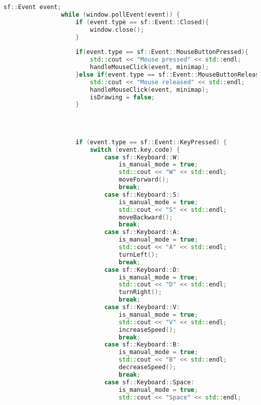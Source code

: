 \begin{lstlisting}[language={C++}, caption={Quinto ajuste de c\'odigo}, label={QuintoAjuste}]
                sf::Event event;
                while (window.pollEvent(event)) {
                    if (event.type == sf::Event::Closed){
                        window.close();
                    }
        
                    if(event.type == sf::Event::MouseButtonPressed){
                        std::cout << "Mouse pressed" << std::endl;
                        handleMouseClick(event, minimap);
                    }else if(event.type == sf::Event::MouseButtonReleased){
                        std::cout << "Mouse released" << std::endl;
                        handleMouseClick(event, minimap);
                        isDrawing = false;
                    }
                    
        
        
        
                    if (event.type == sf::Event::KeyPressed) {
                        switch (event.key.code) {
                            case sf::Keyboard::W:
                                is_manual_mode = true;
                                std::cout << "W" << std::endl;
                                moveForward();
                                break;
                            case sf::Keyboard::S:
                                is_manual_mode = true;
                                std::cout << "S" << std::endl;
                                moveBackward();
                                break;
                            case sf::Keyboard::A:
                                is_manual_mode = true;
                                std::cout << "A" << std::endl;
                                turnLeft();
                                break;
                            case sf::Keyboard::D:
                                is_manual_mode = true;
                                std::cout << "D" << std::endl;
                                turnRight();
                                break;
                            case sf::Keyboard::V:
                                is_manual_mode = true;
                                std::cout << "V" << std::endl;
                                increaseSpeed();
                                break;
                            case sf::Keyboard::B:
                                is_manual_mode = true;
                                std::cout << "B" << std::endl;
                                decreaseSpeed();
                                break;
                            case sf::Keyboard::Space:
                                is_manual_mode = true;
                                std::cout << "Space" << std::endl;

\end{lstlisting}
